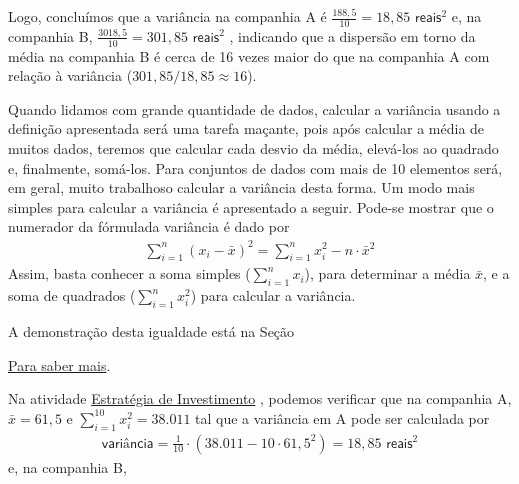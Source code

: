 {{{Logo, concluímos que a variância na companhia A é \(\frac{188,5}{10}=18,85\textsf{ reais}^2\) e, na companhia B, \(\frac{3018,5}{10}=301,85\textsf{ reais}^2\) , indicando que a dispersão em torno da média na companhia B é cerca de 16 vezes maior do que na companhia A com relação à variância  (\(301,85/18,85\approx 16\)).

Quando lidamos com grande quantidade de dados, calcular a variância usando a definição apresentada será uma tarefa maçante, pois após calcular a média de muitos dados, teremos que calcular cada desvio da média, elevá-los ao quadrado e, finalmente, somá-los. Para conjuntos de dados com  mais de 10 elementos será, em geral, muito trabalhoso calcular a variância desta forma. Um modo mais simples para calcular a variância é apresentado a seguir.  Pode-se mostrar que o numerador da fórmulada variância é dado por
\begin{equation*}
\begin{split}\sum^n_{i=1} (x_i-\bar{x})^2 = \sum^n_{i=1} x^2_i-n\cdot \bar{x}^2\end{split}
\end{equation*}
Assim, basta conhecer a soma simples (\(\displaystyle{\sum^n_{i=1}}x_i\)), para determinar a média \(\bar{x}\), e a soma de quadrados (\(\displaystyle{\sum^n_{i=1}}x^2_i\)) para calcular a variância.

A demonstração desta igualdade está na Seção {\hyperref[\detokenize{PE104-A:sec-para-saber-mais}]{Para saber mais}.

Na atividade \hyperref[\detokenize{PE104-3:ativ-estrategia-de-investimento}]{Estratégia de Investimento} , podemos verificar que na companhia A, \(\bar{x}=61,5\) e \(\displaystyle{\sum^{10}_{i=1}} x^2_i=38.011\) tal que a variância em A pode ser calculada por
\begin{equation*}
\begin{split}\textsf{variância}=\frac{1}{10}\cdot (38.011-10\cdot 61,5^2)=18,85\textsf{ reais}^2\end{split}
\end{equation*}
e, na companhia B,

}}}}
